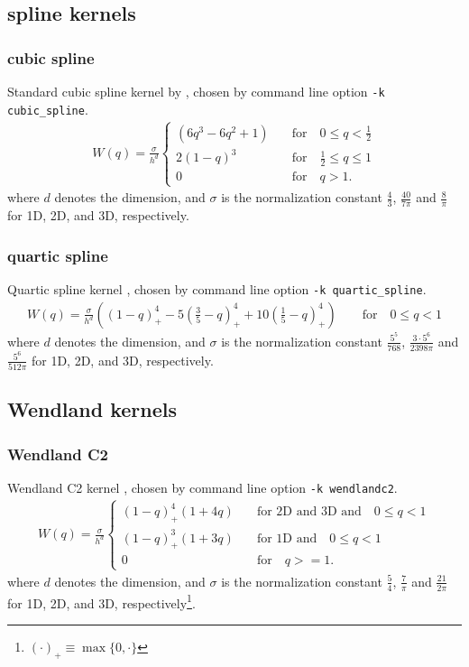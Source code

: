\documentclass[10pt,fleqn,twoside]{article}
\begin{document}
\subsection{spline kernels}
\subsubsection{cubic spline}
Standard cubic spline kernel by \cite{1985A&A...149..135M}, chosen by command line option \texttt{-k
 cubic\_spline}.
\begin{align}
 W(q) = \frac{\sigma}{h^d} \left\{
 \begin{array}{ll}
  ( 6 q^3 - 6q^2  + 1 ) & \quad \mbox{for} \quad 0 \leq q < \frac{1}{2}    \\
  2(1 - q)^3            & \quad \mbox{for} \quad \frac{1}{2} \leq q \leq 1 \\
  0                     & \quad \mbox{for} \quad q > 1.
 \end{array}
 \right.
\end{align}
where $d$ denotes the dimension, and $\sigma$ is the normalization constant $\frac{4}{3}$,
$\frac{40}{7\pi}$ and $\frac{8}{\pi}$ for 1D, 2D, and 3D, respectively.
\subsubsection{quartic spline}
Quartic spline kernel \citep{2012MNRAS.425.1068D}, chosen by command line option \texttt{-k
 quartic\_spline}.
\begin{align}
 W(q) = \frac{\sigma}{h^d} \left( \left(1-q\right)_+^4 -5\left(\frac{3}{5}-q\right)_+^4 +
 10\left(\frac{1}{5}-q\right)_+^4\right) \qquad \mbox{for} \quad 0 \leq q < 1
\end{align}
where $d$ denotes the dimension, and $\sigma$ is the normalization constant $\frac{5^5}{768}$,
$\frac{3\cdot5^6}{2398\pi}$ and $\frac{5^6}{512\pi}$ for 1D, 2D, and 3D, respectively.


\subsection{Wendland kernels}
\subsubsection{Wendland C2}
Wendland C2 kernel \citep{2012MNRAS.425.1068D}, chosen by command line option \texttt{-k
 wendlandc2}.
\begin{align}
 W(q) = \frac{\sigma}{h^d} \left\{
 \begin{array}{ll}
  (1-q)_+^4 (1+4q) & \quad \mbox{for 2D and 3D and} \quad 0 \leq  q < 1 \\
  (1-q)_+^3 (1+3q) & \quad \mbox{for 1D and} \quad 0 \leq  q < 1        \\
  0                & \quad \mbox{for} \quad q >= 1.
 \end{array}
 \right.
\end{align}
where $d$ denotes the dimension, and $\sigma$ is the normalization constant $\frac{5}{4}$,
$\frac{7}{\pi}$ and $\frac{21}{2\pi}$ for 1D, 2D, and 3D, respectively\footnote{$(\cdot)_+ \equiv
  \max\{0,\cdot\}$}.
\end{document}
